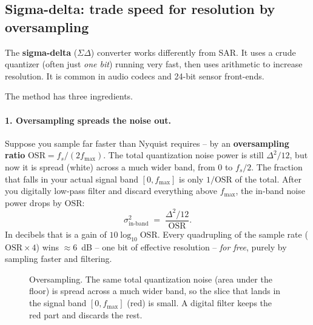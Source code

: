 \subsection{Sigma-delta: trade speed for resolution by oversampling}
\label{ch19:sigmadelta}
The \textbf{sigma-delta} ($\Sigma\Delta$) converter works differently from SAR. It uses a crude quantizer (often just \emph{one bit}) running very fast, then uses arithmetic to increase resolution. It is common in audio codecs and 24-bit sensor front-ends.

The method has three ingredients.

\paragraph{1. Oversampling spreads the noise out.} Suppose you sample far faster than Nyquist
requires -- by an \textbf{oversampling ratio} $\mathrm{OSR} = f_s / (2 f_{\max})$. The total
quantization noise power is still $\Delta^2/12$, but now it is spread (white) across a much wider
band, from $0$ to $f_s/2$. The fraction that falls in your actual signal band $[0, f_{\max}]$ is
only $1/\mathrm{OSR}$ of the total. After you digitally low-pass filter and discard everything
above $f_{\max}$, the in-band noise power drops by $\mathrm{OSR}$:
\[
  \sigma_{\mathrm{in\text{-}band}}^2 \;=\; \frac{\Delta^2/12}{\mathrm{OSR}}.
\]
In decibels that is a gain of $10\log_{10}\mathrm{OSR}$. Every quadrupling of the sample rate
($\mathrm{OSR}\times 4$) wins $\approx 6$~dB -- one bit of effective resolution -- \emph{for free},
purely by sampling faster and filtering.

\begin{figure}[H]
\centering
{}
\caption{Oversampling. The same total quantization noise (area under the floor) is spread across a
much wider band, so the slice that lands in the signal band $[0,f_{\max}]$ (red) is small. A
digital filter keeps the red part and discards the rest.}
\label{ch19:fig-oversample}
\end{figure}

